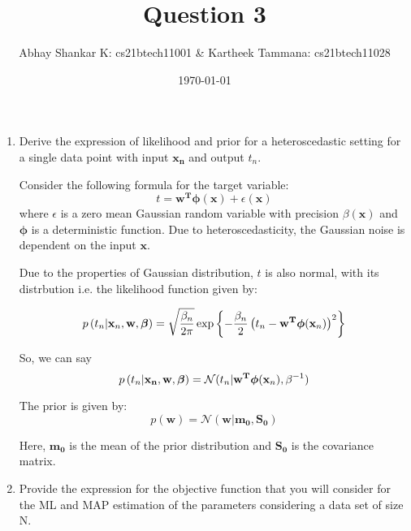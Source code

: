 \documentclass[reqno]{amsart}
\begin{document}
    \title{Question 3}
    \author{Abhay Shankar K: cs21btech11001 \& Kartheek Tammana: cs21btech11028}
    \date{\today}
    \maketitle

    \begin{enumerate}[label=\textbf{(\Roman*)}]
        \item Derive the expression of likelihood and prior for a heteroscedastic setting for a single data point with input \(\mathbf{x_n}\) and output \(t_n\).
        
        Consider the following formula for the target variable:
        \[t = \mathbf{w^T} \boldsymbol{\phi}(\mathbf{x}) + \epsilon(\mathbf{x})\] where \(\epsilon\) is a zero mean Gaussian random variable with precision \(\beta(\mathbf{x})\) and \(\boldsymbol{\phi}\) is a deterministic function. 
        Due to heteroscedasticity, the Gaussian noise is dependent on the input \(\mathbf{x}\). 
        
        Due to the properties of Gaussian distribution, \(t\) is also normal, with its distrbution i.e. the likelihood function given by:

        \[
        p\left(t_n | \mathbf{x}_n, \mathbf{w}, \boldsymbol{\beta}\right) 
            = 
        \sqrt{\frac{\beta_n}{2\pi}} \exp \left\{- \frac{\beta_n}{2} \left(t_n - \mathbf{w^T} \boldsymbol{\phi}(\mathbf{x}_n)\right)^2\right\}\]



        So, we can say
        \[p\left(t_n | \mathbf{x_n}, \mathbf{w}, \boldsymbol{\beta}\right) = \mathcal{N} (t_n | \mathbf{w^T} \boldsymbol{\phi}(\mathbf{x}_n), \beta^{-1})\]


        The prior is given by:
        \[p(\mathbf{w}) = \mathcal{N}(\mathbf{w} | \mathbf{m_0}, \mathbf{S_0})\]

        Here, \(\mathbf{m_0}\) is the mean of the prior distribution and \(\mathbf{S_0}\) is the covariance matrix.


        \item Provide the expression for the objective function that you will consider for the ML and MAP estimation of the parameters considering a data set of size N.


\end{enumerate}
\end{document}
